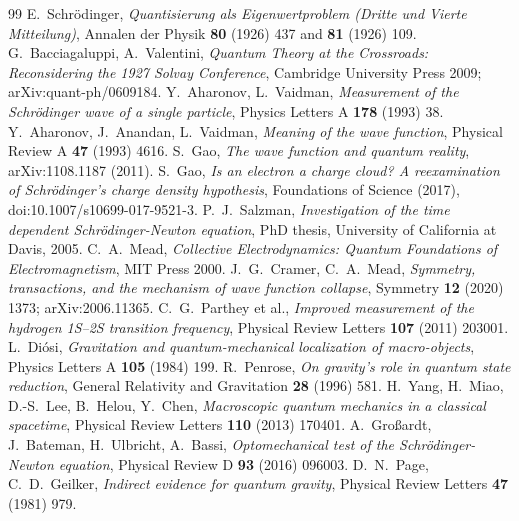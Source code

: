 \begingroup\renewcommand{\chapter}[2]{}\small
\begin{thebibliography}{99}
 E.~Schrödinger, \textit{Quantisierung als Eigenwertproblem (Dritte und Vierte Mitteilung)}, Annalen der Physik \textbf{80} (1926) 437 and \textbf{81} (1926) 109.
 G.~Bacciagaluppi, A.~Valentini, \textit{Quantum Theory at the Crossroads: Reconsidering the 1927 Solvay Conference}, Cambridge University Press 2009; arXiv:quant-ph/0609184.
 Y.~Aharonov, L.~Vaidman, \textit{Measurement of the Schrödinger wave of a single particle}, Physics Letters A \textbf{178} (1993) 38.
 Y.~Aharonov, J.~Anandan, L.~Vaidman, \textit{Meaning of the wave function}, Physical Review A \textbf{47} (1993) 4616.
 S.~Gao, \textit{The wave function and quantum reality}, arXiv:1108.1187 (2011).
 S.~Gao, \textit{Is an electron a charge cloud? A reexamination of Schrödinger's charge density hypothesis}, Foundations of Science (2017), doi:10.1007/s10699-017-9521-3.
 P.~J.~Salzman, \textit{Investigation of the time dependent Schrödinger-Newton equation}, PhD thesis, University of California at Davis, 2005.
 C.~A.~Mead, \textit{Collective Electrodynamics: Quantum Foundations of Electromagnetism}, MIT Press 2000.
 J.~G.~Cramer, C.~A.~Mead, \textit{Symmetry, transactions, and the mechanism of wave function collapse}, Symmetry \textbf{12} (2020) 1373; arXiv:2006.11365.
 C.~G.~Parthey et al., \textit{Improved measurement of the hydrogen 1S--2S transition frequency}, Physical Review Letters \textbf{107} (2011) 203001.
 L.~Diósi, \textit{Gravitation and quantum-mechanical localization of macro-objects}, Physics Letters A \textbf{105} (1984) 199.
 R.~Penrose, \textit{On gravity's role in quantum state reduction}, General Relativity and Gravitation \textbf{28} (1996) 581.
 H.~Yang, H.~Miao, D.-S.~Lee, B.~Helou, Y.~Chen, \textit{Macroscopic quantum mechanics in a classical spacetime}, Physical Review Letters \textbf{110} (2013) 170401.
 A.~Großardt, J.~Bateman, H.~Ulbricht, A.~Bassi, \textit{Optomechanical test of the Schrödinger-Newton equation}, Physical Review D \textbf{93} (2016) 096003.
 D.~N.~Page, C.~D.~Geilker, \textit{Indirect evidence for quantum gravity}, Physical Review Letters \textbf{47} (1981) 979.
\end{thebibliography}
\endgroup
